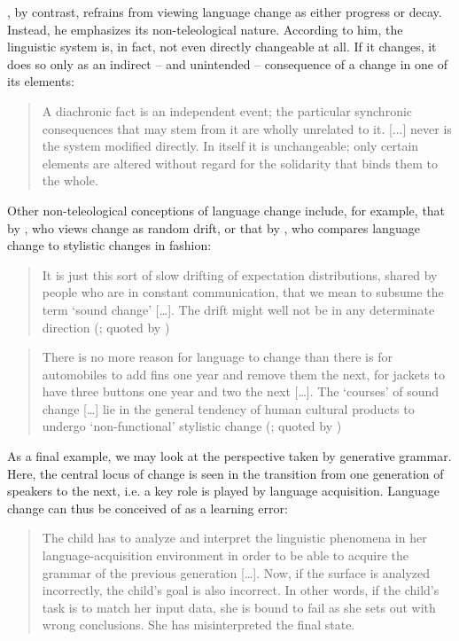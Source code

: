 \documentclass[output=paper,colorlinks,citecolor=brown]{langscibook}
\begin{document}
, by contrast, refrains from viewing language change as either progress or decay. Instead, he emphasizes its non-teleological nature. According to him, the linguistic system is, in fact, not even directly changeable at all. If it changes, it does so only as an indirect -- and unintended -- consequence of a change in one of its elements:

\begin{quote}
A diachronic fact is an independent event; the particular synchronic consequences that may stem from it are wholly unrelated to it. [...] never is the system modified directly. In itself it is unchangeable; only certain elements are altered without regard for the solidarity that binds them to the whole. \citep[84]{Saussure2011}
\end{quote}

Other non-teleological conceptions of language change include, for example, that by \citet{Hockett_1958}, who views change as random drift, or that by \citet{Postal_1968}, who compares language change to stylistic changes in fashion:

\begin{quote}
It is just this sort of slow drifting of expectation distributions, shared by people who are in constant communication, that we mean to subsume the term ‘sound change’ […]. The drift might well not be in any determinate direction (\citealt[443-445]{Hockett_1958}; quoted by \citealt[135-136]{Aitchison_2001})
\end{quote}

\begin{quote}
There is no more reason for language to change than there is for automobiles to add fins one year and remove them the next, for jackets to have three buttons one year and two the next […]. The ‘courses’ of sound change […] lie in the general tendency of human cultural products to undergo ‘non-functional’ stylistic change (\citealt[283]{Postal_1968}; quoted by \citealt[135]{Aitchison_2001})
\end{quote}

As a final example, we may look at the perspective taken by generative grammar. Here, the central locus of change is seen in the transition from one generation of speakers to the next, i.e. a key role is played by language acquisition. Language change can thus be conceived of as a learning error:

\begin{quote}
The child has to analyze and interpret the linguistic phenomena in her language-acquisition environment in order to be able to acquire the grammar of the previous generation […]. Now, if the surface is analyzed incorrectly, the child's goal is also incorrect. In other words, if the child's task is to match her input data, she is bound to fail as she sets out with wrong conclusions. She has misinterpreted the final state. \citep[119]{Hróarsdóttir_2009}
\end{quote}
\end{document}
